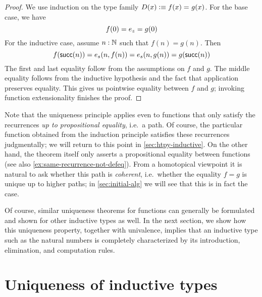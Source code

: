 \begin{proof}
We use induction on the type family $D(x) \vcentcolon\equiv f(x) =_{} g(x)$. For the base case, we have \[f(0) = e_z = g(0)\]
For the inductive case, assume $n : \mathbb{N}$ such that $f(n) = g(n)$. Then
\[ f(\mathsf{succ}(n)) = e_s(n, f(n)) = e_s(n, g(n)) = g(\mathsf{succ}(n)) \]
The first and last equality follow from the assumptions on $f$ and $g$. The middle equality follows from the inductive hypothesis and the fact that application preserves equality. This gives us pointwise equality between $f$ and $g$; invoking function extensionality finishes the proof.
\end{proof}

Note that the uniqueness principle applies even to functions that only satisfy the recurrences \emph{up to propositional equality}, i.e.\ a path.
Of course, the particular function obtained from the induction principle satisfies these recurrences judgmentally; we will return to this point in \autoref{sec:htpy-inductive}.
On the other hand, the theorem itself only asserts a propositional equality between functions (see also \autoref{ex:same-recurrence-not-defeq}).
From a homotopical viewpoint it is natural to ask whether this path is \emph{coherent}, i.e.\ whether the equality $f=g$ is unique up to higher paths; in \autoref{sec:initial-alg} we will see that this is in fact the case.

Of course, similar uniqueness theorems for functions can generally be formulated and shown for other inductive types as well.
In the next section, we show how this uniqueness property, together with univalence, implies that an inductive type such as the natural numbers is completely characterized by its introduction, elimination, and computation rules.



\section{Uniqueness of inductive types}
\label{sec:appetizer-univalence}

\newcommand{\natp}{\ensuremath{\nat'}\xspace}
\newcommand{\zp}{\ensuremath{0'}\xspace}
\newcommand{\Sp}{\ensuremath{\suc'}\xspace}
\newcommand{\dblp}{\ensuremath{\dbl'}\xspace}

